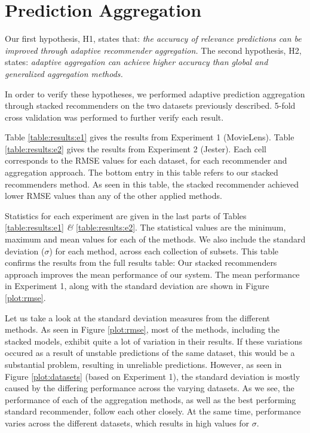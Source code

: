 \section{Prediction Aggregation}





Our first hypothesis, H1, states that:
{
  \itshape
  the accuracy of relevance predictions can be improved
  through adaptive recommender aggregation.
}
The second hypothesis, H2, states:
{
  \itshape
  adaptive aggregation can achieve higher accuracy than global and generalized aggregation methods.
}

In order to verify these hypotheses, we performed adaptive prediction aggregation
through stacked recommenders on the two datasets previously described.
5-fold cross validation was performed to further verify each result.

Table \ref{table:results:e1} gives the results from Experiment 1 (MovieLens).
Table \ref{table:results:e2} gives the results from Experiment 2 (Jester).
Each cell corresponds to the RMSE values for each dataset,
for each recommender and aggregation approach.
The bottom entry in this table refers to our stacked recommenders method.
As seen in this table, the stacked recommender achieved
lower RMSE values than any of the other applied methods.

Statistics for each experiment are given in the last
parts of Tables \ref{table:results:e1} \emph{\&} \ref{table:results:e2}. 
The statistical values are the minimum, maximum and mean values
for each of the methods. We also include
the standard deviation ($\sigma$) for each method,
across each collection of subsets.
This table confirms the results from the full results table:
Our stacked recommenders approach improves the mean performance
of our system.
The mean performance in Experiment 1, along with the standard deviation
are shown in Figure \ref{plot:rmse}.


%



Let us take a look at the standard deviation measures from the different methods.
As seen in Figure \ref{plot:rmse}, 
most of the methods, including the stacked models,
exhibit quite a lot of variation in their results.
If these variations occured as a result of unstable
predictions of the same dataset, this would be a substantial problem,
resulting in unreliable predictions.
However, as seen in Figure \ref{plot:datasets}
(based on Experiment 1),
the standard deviation is mostly caused by the differing
performance across the varying datasets.
As we see, the performance of each of the aggregation methods,
as well as the best performing standard recommender,
follow each other closely. At the same time,
performance varies across the different datasets,
which results in high values for $\sigma$.

